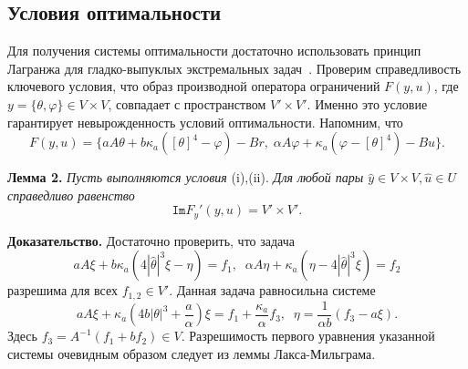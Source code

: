 \subsection{Условия оптимальности}\label{subsec:2_optimality}


    Для получения системы оптимальности достаточно использовать
    принцип Лагранжа для гладко-выпуклых экстремальных задач~\cite{10,11}.
    Проверим справедливость ключевого условия, что образ производной
    оператора ограничений $F(y, u)$, где $y=\{\theta,\varphi\}\in V\times V$,
    совпадает с пространством $V'\times V'.$ Именно это условие гарантирует
    невырожденность условий оптимальности.
    Напомним, что
    \[
        F(y, u) = \{ aA\theta + b \kappa_a ( [\theta]^4- \varphi) - Br,\;
        \alpha A \varphi + \kappa_a (\varphi -[\theta]^4) - Bu\}.
    \]


    \textbf{Лемма 2.}
    \textit{Пусть выполняются условия} (i),(ii).
        \textit{Для любой пары $\hat{y} \in V \times V, \hat{u} \in U$ справедливо равенство}
    \[
        \texttt{Im}F_y'(y, u) = V' \times V'.
    \]


        \textbf{Доказательство.} Достаточно проверить, что задача
    \[
        aA \xi + b \kappa_a (4|\hat{\theta}|^3 \xi - \eta) = f_1, \; \;
        \alpha A \eta + \kappa_a (\eta - 4|\hat{\theta}|^3 \xi) = f_2
    \]
    разрешима для всех $f_{1,2}\in V'.$ Данная задача равносильна системе
    \[
        aA\xi + \kappa_a\left(4b|\theta|^3 + \frac{a}{\alpha}\right) \xi = f_1
        +\frac{\kappa_a}{\alpha}f_3, \; \;
        \eta =\frac{1}{\alpha b}( f_3-a\xi).
    \]
    Здесь $f_3=A^{-1}(f_1+bf_2)\in V.$ Разрешимость первого уравнения указанной системы очевидным образом следует из леммы Лакса-Мильграма.


